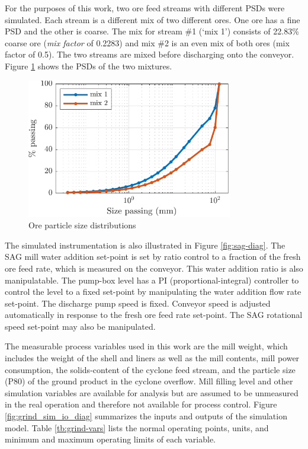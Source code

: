 {For the purposes of this work, two ore feed streams with different PSDs were simulated. Each stream is a different mix of two different ores. One ore has a fine PSD and the other is coarse. The mix for stream \#1 (`mix 1') consists of 22.83\% coarse ore (\textit{mix factor} of 0.2283) and mix \#2 is an even mix of both ores (mix factor of 0.5). The two streams are mixed before discharging onto the conveyor. Figure \ref{fig:coarse_fine_psd_plot} shows the PSDs of the two mixtures.

\begin{figure}[htp]
	\centering
	\includegraphics[width=9cm]{images/coarse_fine_cumpsd_plot.pdf}
	\caption{Ore particle size distributions}
	\label{fig:coarse_fine_psd_plot}
\end{figure}

The simulated instrumentation is also illustrated in Figure \ref{fig:sag-diag}. The SAG mill water addition set-point is set by ratio control to a fraction of the fresh ore feed rate, which is measured on the conveyor. This water addition ratio is also manipulatable. The pump-box level has a PI (proportional-integral) controller to control the level to a fixed set-point by manipulating the water addition flow rate set-point. The discharge pump speed is fixed. Conveyor speed is adjusted automatically in response to the fresh ore feed rate set-point. The SAG rotational speed set-point may also be manipulated.

The measurable process variables used in this work are the mill weight, which includes the weight of the shell and liners as well as the mill contents, mill power consumption, the solids-content of the cyclone feed stream, and the particle size (P80) of the ground product in the cyclone overflow. Mill filling level and other simulation variables are available for analysis but are assumed to be unmeasured in the real operation and therefore not available for process control.  Figure \ref{fig:grind_sim_io_diag} summarizes the inputs and outputs of the simulation model. Table \ref{tb:grind-vars} lists the normal operating points, units, and minimum and maximum operating limits of each variable.

}

